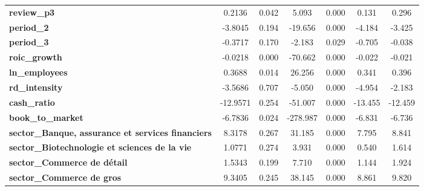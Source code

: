 \begin{center}
\begin{tabular}{lcccccc}
\textbf{review\_p3}                                                   &       0.2136  &        0.042     &     5.093  &         0.000        &        0.131    &        0.296     \\
\textbf{period\_2}                                                    &      -3.8045  &        0.194     &   -19.656  &         0.000        &       -4.184    &       -3.425     \\
\textbf{period\_3}                                                    &      -0.3717  &        0.170     &    -2.183  &         0.029        &       -0.705    &       -0.038     \\
\textbf{roic\_growth}                                                 &      -0.0218  &        0.000     &   -70.662  &         0.000        &       -0.022    &       -0.021     \\
\textbf{ln\_employees}                                                &       0.3688  &        0.014     &    26.256  &         0.000        &        0.341    &        0.396     \\
\textbf{rd\_intensity}                                                &      -3.5686  &        0.707     &    -5.050  &         0.000        &       -4.954    &       -2.183     \\
\textbf{cash\_ratio}                                                  &     -12.9571  &        0.254     &   -51.007  &         0.000        &      -13.455    &      -12.459     \\
\textbf{book\_to\_market}                                             &      -6.7836  &        0.024     &  -278.987  &         0.000        &       -6.831    &       -6.736     \\
\textbf{sector\_Banque, assurance et services financiers}             &       8.3178  &        0.267     &    31.185  &         0.000        &        7.795    &        8.841     \\
\textbf{sector\_Biotechnologie et sciences de la vie}                 &       1.0771  &        0.274     &     3.931  &         0.000        &        0.540    &        1.614     \\
\textbf{sector\_Commerce de détail}                                   &       1.5343  &        0.199     &     7.710  &         0.000        &        1.144    &        1.924     \\
\textbf{sector\_Commerce de gros}                                     &       9.3405  &        0.245     &    38.145  &         0.000        &        8.861    &        9.820     \\

\end{tabular}
\end{center}
